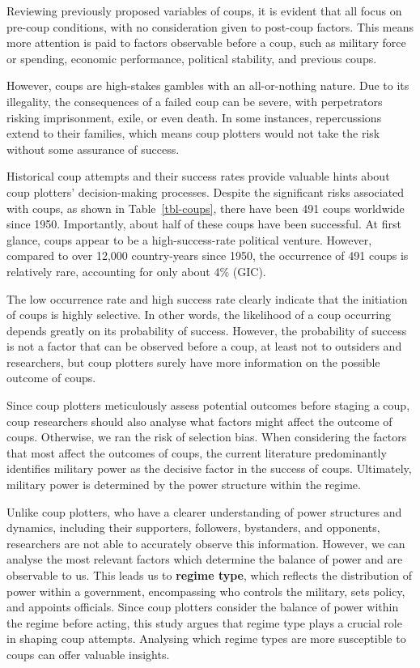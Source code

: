 \documentclass[
  12pt,
]{report}
\begin{document}
Reviewing previously proposed variables of coups, it is evident that all
focus on pre-coup conditions, with no consideration given to post-coup
factors. This means more attention is paid to factors observable before
a coup, such as military force or spending, economic performance,
political stability, and previous coups.

However, coups are high-stakes gambles with an all-or-nothing nature.
Due to its illegality, the consequences of a failed coup can be severe,
with perpetrators risking imprisonment, exile, or even death. In some
instances, repercussions extend to their families, which means coup
plotters would not take the risk without some assurance of success.

Historical coup attempts and their success rates provide valuable hints
about coup plotters' decision-making processes. Despite the significant
risks associated with coups, as shown in Table~\ref{tbl-coups}, there
have been 491 coups worldwide since 1950. Importantly, about half of
these coups have been successful. At first glance, coups appear to be a
high-success-rate political venture. However, compared to over 12,000
country-years since 1950, the occurrence of 491 coups is relatively
rare, accounting for only about 4\% (GIC).

The low occurrence rate and high success rate clearly indicate that the
initiation of coups is highly selective. In other words, the likelihood
of a coup occurring depends greatly on its probability of success.
However, the probability of success is not a factor that can be observed
before a coup, at least not to outsiders and researchers, but coup
plotters surely have more information on the possible outcome of coups.

Since coup plotters meticulously assess potential outcomes before
staging a coup, coup researchers should also analyse what factors might
affect the outcome of coups. Otherwise, we ran the risk of selection
bias. When considering the factors that most affect the outcomes of
coups, the current literature predominantly identifies military power as
the decisive factor in the success of coups. Ultimately, military power
is determined by the power structure within the regime.

Unlike coup plotters, who have a clearer understanding of power
structures and dynamics, including their supporters, followers,
bystanders, and opponents, researchers are not able to accurately
observe this information. However, we can analyse the most relevant
factors which determine the balance of power and are observable to us.
This leads us to \textbf{regime type}, which reflects the distribution
of power within a government, encompassing who controls the military,
sets policy, and appoints officials. Since coup plotters consider the
balance of power within the regime before acting, this study argues that
regime type plays a crucial role in shaping coup attempts. Analysing
which regime types are more susceptible to coups can offer valuable
insights.
\end{document}
